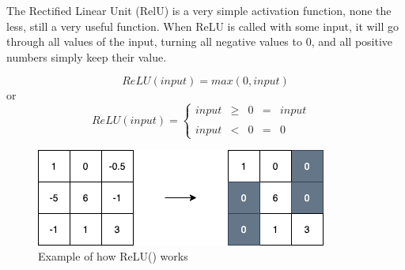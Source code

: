 The Rectified Linear Unit (RelU) is a very simple activation function, none the less, still a very useful function. When ReLU is called with some input, it will go through all values of the input, turning all negative values to 0, and all positive numbers simply keep their value.

$$
ReLU(input) = max(0,input)
$$
or
$$
ReLU(input) =
\left\{ \begin{matrix}
        input& \geq& 0& =& input& \\
        \\
        input& <& 0& =& 0&
\end{matrix}
\right.
$$


\begin{figure}[!ht]
  \centering
  \includegraphics[scale=0.4]{latex/IMGs/relu.png}
  \caption{Example of how ReLU() works}\label{Baseline:before}
\end{figure}
